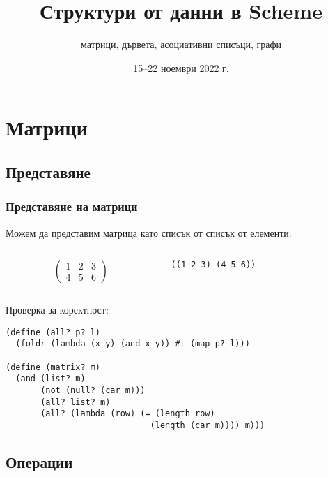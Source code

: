 \documentclass[alsotrans]{beamerswitch}
\title{Структури от данни в Scheme}
\subtitle{матрици, дървета, асоциативни списъци, графи}
\date{15--22 ноември 2022 г.}
\begin{document}
\begin{frame}
  \titlepage
\end{frame}

\section{Матрици}

\subsection{Представяне}

\begin{frame}[fragile]
  \frametitle{Представяне на матрици}
  Можем да представим матрица като списък от списък от елементи:\\
  \begin{columns}[T,onlytextwidth]
    \begin{column}{0.5\textwidth}
      \begin{equation*}
        \left(
          \begin{array}{ccc}
            1 & 2 & 3\\
            4 & 5 & 6
          \end{array}
        \right)
      \end{equation*}
    \end{column}
    \begin{column}{0.5\textwidth}
      \vspace{2ex}
      \tt{((1 2 3) (4 5 6))}
    \end{column}
  \end{columns}
  \vspace{2ex}
  \pause
  Проверка за коректност:
  \pause
\begin{lstlisting}
(define (all? p? l)
  (foldr (lambda (x y) (and x y)) #t (map p? l)))

(define (matrix? m)
  (and (list? m)
       (not (null? (car m)))
       (all? list? m)
       (all? (lambda (row) (= (length row)
                             (length (car m)))) m)))
\end{lstlisting}
\end{frame}

\subsection{Операции}
\end{document}
